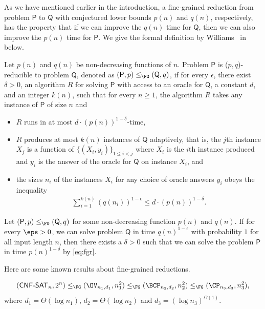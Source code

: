 As we have mentioned earlier in the introduction, a fine-grained reduction from problem $\mathsf{P}$ to $\mathsf{Q}$ with conjectured lower bounds $p(n)$ and $q(n)$, respectively, has the property that if we can improve the $q(n)$ time for $\mathsf{Q}$, then we can also improve the $p(n)$ time for $\mathsf{P}$. We give the formal definition by Williams~\cite{r46} in below. 

\begin{definition}\label{def:fg}
Let $p(n)$ and $q(n)$ be non-decreasing functions of $n$. Problem $\mathsf{P}$ is ($p,q$)-reducible to problem $\mathsf{Q}$, denoted as $(\mathsf{P},p)\leq_{\FG} (\mathsf{Q},q)$, if for every $\epsilon$, there exist $\delta>0$, an algorithm $R$ for solving $\mathsf{P}$ with access to an oracle for $\mathsf{Q}$, a constant $d$, and an integer $k(n)$, such that for every $n\ge 1$, the algorithm $R$ takes any instance of $\mathsf{P}$ of size $n$ and 
\begin{itemize}
    \item $R$ runs in at most $d\cdot (p(n))^{1-\delta}$-time, 
    \item $R$ produces at most $k(n)$ instances of $\mathsf{Q}$ adaptively, that is, the $j$th instance $X_j$ is a function of $\{(X_i,y_i)\}_{1\leq i<j}$ where $X_i$ is the $i$th instance produced and $y_i$ is the answer of the oracle for $\mathsf{Q}$ on instance $X_i$, and 
    \item the sizes $n_i$ of the instances $X_i$ for any choice of oracle answers $y_i$ obeys the inequality
    \begin{align}\label{eq:fgr}
        \sum_{i=1}^{k(n)} (q(n_i))^{1-\epsilon} \leq d\cdot (p(n))^{1-\delta}.
    \end{align}
\end{itemize}
\end{definition}

Let $(\mathsf{P},p)\leq_{\FG} (\mathsf{Q},q)$ for some non-decreasing function $p(n)$ and $q(n)$. If for every $\eps > 0$, we can solve problem $\mathsf{Q}$ in time $q(n)^{1-\epsilon}$ with probability $1$ for all input length $n$, then there exists a $\delta>0$ such that we can solve the problem $\mathsf{P}$ in time $p(n)^{1-\delta}$ 
by \cref{eq:fgr}.

Here are some known results about fine-grained reductions.
\begin{theorem}[\cite{r29,r49}]\label{thm:classical_fg}
\begin{align}
    (\mathsf{CNF\text{-}SAT}_{n},2^n)\leq_{\FG} (\OV_{n_1,d_1},n_1^2)\leq_{\FG} (\BCP_{n_2,d_2},n_2^2)\leq_{\FG} (\CP_{n_3,d_3},n_3^2),
\end{align}
where $d_1=\Theta(\log n_1)$, $d_2=\Theta(\log n_2)$ and $d_3=(\log  n_3)^{\Omega(1)}$.
\end{theorem}

